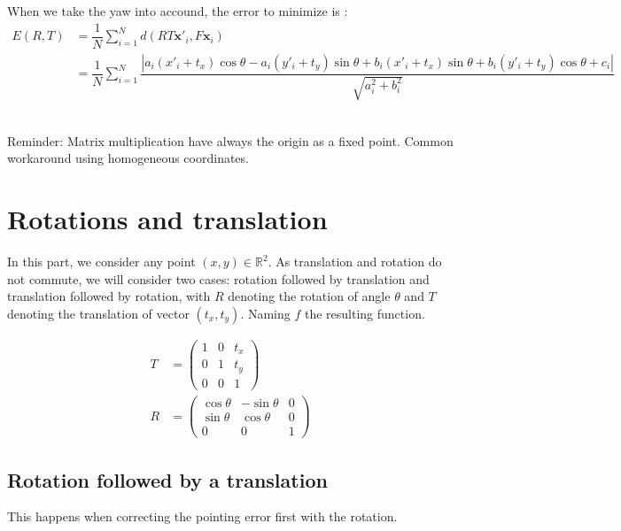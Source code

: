 \documentclass[paper=a4, fontsize=11pt, onecolumn, tikz, dvipsnames, svgnames, x11names]{article}
\begin{document}
When we take the yaw into accound, the error to minimize is :
\begin{align*}
E(R, T) &= \dfrac{1}{N} \sum\limits_{i=1}^{N} d(RT\textbf{x}'_i, F\textbf{x}_i) \\
&= \dfrac{1}{N} \sum\limits_{i=1}^{N} \dfrac{|a_i(x'_i + t_x)\cos \theta  - a_i (y'_i + t_y)\sin \theta  + b_i(x'_i + t_x)\sin \theta  + b_i  (y'_i + t_y)\cos \theta+ c_i|}{\sqrt{a_i^2 + b_i^2}}
\end{align*}\\


\appendix

Reminder: Matrix multiplication have always the origin as a fixed point. Common workaround using homogeneous coordinates.

\section{Rotations and translation}

In this part, we consider any point \((x, y) \in \mathbb{R}^2\). As translation and rotation do not commute, we will consider two cases: rotation followed by translation and translation followed by rotation, with \(R\) denoting the rotation of angle \(\theta\) and \(T\) denoting the translation of vector \((t_x, t_y)\). Naming \(f\) the resulting function.

\begin{align*}
    T &=
    \begin{pmatrix}
    1 & 0 & t_x \\
    0 & 1 & t_y \\
    0 & 0 & 1
    \end{pmatrix}
    \\
    R &=
    \begin{pmatrix}
    \cos \theta & -\sin \theta & 0 \\
    \sin \theta & \cos \theta & 0 \\
    0 & 0 & 1
    \end{pmatrix}
\end{align*}


\subsection{Rotation followed by a translation}
This happens when correcting the pointing error first with the rotation.
\end{document}
